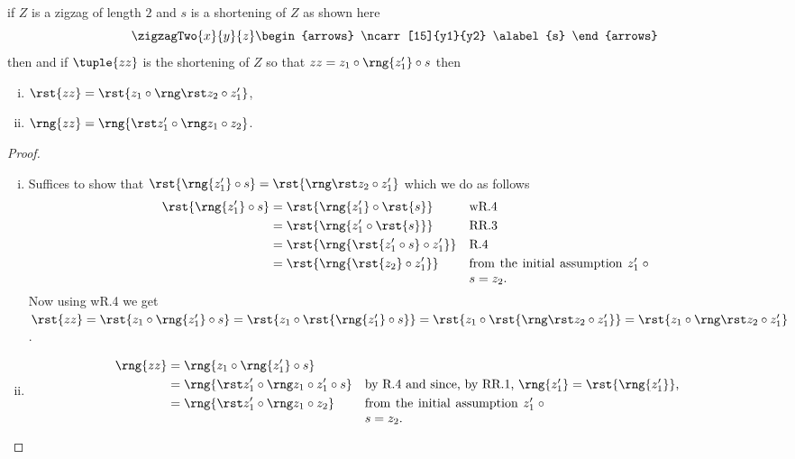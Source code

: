 \begin{lemma}
if $Z$ is a zigzag of length $2$ and $s$ is a shortening
of $Z$ as shown here
\[
\zigzagTwo{x}{y}{z}
\begin{arrows}
\ncarr[15]{y1}{y2} \alabel{s}
\end{arrows}
\]
then
and if $\tuple{zz}$ is the shortening of $Z$
so that
$zz=z_1 \circ \rng{z'_1} \circ s$
then
\begin{enumerate}[(i)]
\item $\rst{zz}= \rst{z_1 \circ \rngTightenerOne{z}}$,
\item $\rng{zz} =\rng{\rstTightener{z}{1} \circ z_2  }$.
\end{enumerate}
\end{lemma}
\begin{proof}
\begin{enumerate}[(i)]
\item Suffices to show that 
$\rst{\rng{z'_1} \circ s}=\rst{\rngTightenerOne{z}}$
which we do as follows
\begin{align*}
\rst{\rng{z'_1} \circ s} 
    &= \rst{\rng{z'_1} \circ \rst{s}} && \mbox{wR.4}\\
    &= \rst{ \rng{ z'_1 \circ \rst{s} } }
                                      && \mbox{RR.3} \\
    &= \rst{ \rng{ \rst{z'_1 \circ s} \circ z'_1 } }
                                      && \mbox{R.4} \\
        &= \rst{ \rng{ \rst{z_2} \circ z'_1 } }
                        && \parbox[t]{5cm}{from the initial assumption 
                        $z'_1 \circ s = z_2$.} 
\end{align*}
Now using wR.4 we get
$\rst{zz}
=\rst{z_1 \circ \rng{z'_1} \circ s}
=\rst{z_1 \circ \rst{\rng{z'_1} \circ s}}
=\rst{z_1 \circ \rst{\rngTightenerOne{z}}}
= \rst{z_1 \circ \rngTightenerOne{z}}$.
\item \begin{align*}
\rng{zz} &= \rng{z_1 \circ \rng{z'_1} \circ s}\\
         &= \rng{
                    \rstTightener{z}{1}
                    \circ z'_1 \circ s
                 }
            &&\mbox{by R.4 and since, by RR.1,
            $ \rng{z'_1}=\rst{\rng{z'_1}}$,
            }\\
         &= \rng{\rstTightener{z}{1} \circ z_2 }
            &&\parbox[t]{5cm}{from the initial assumption  $z'_1 \circ s = z_2$.} 
\end{align*}
\end{enumerate}
\end{proof}


